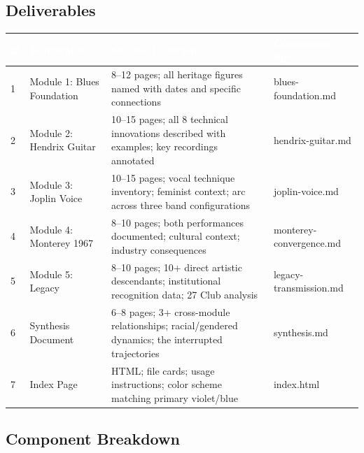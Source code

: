 \documentclass[11pt,letterpaper]{article}
\newcommand{\tableheader}[1]{\textbf{\sffamily\textcolor{white}{#1}}}
\begin{document}
\subsection{Deliverables}

\begin{center}
\begin{tabularx}{\textwidth}{C{0.5cm}L{3.5cm}L{3cm}X}
\toprule
{}
\tableheader{\#} & \tableheader{Deliverable} & \tableheader{Success Criterion} & \tableheader{Component Spec} \\
 & Module 1: Blues Foundation & 8--12 pages; all heritage figures named with dates and specific connections & blues-foundation.md \\
2 & Module 2: Hendrix Guitar & 10--15 pages; all 8 technical innovations described with examples; key recordings annotated & hendrix-guitar.md \\
3 & Module 3: Joplin Voice & 10--15 pages; vocal technique inventory; feminist context; arc across three band configurations & joplin-voice.md \\
4 & Module 4: Monterey 1967 & 8--10 pages; both performances documented; cultural context; industry consequences & monterey-convergence.md \\
5 & Module 5: Legacy & 8--10 pages; 10+ direct artistic descendants; institutional recognition data; 27 Club analysis & legacy-transmission.md \\
6 & Synthesis Document & 6--8 pages; 3+ cross-module relationships; racial/gendered dynamics; the interrupted trajectories & synthesis.md \\
7 & Index Page & HTML; file cards; usage instructions; color scheme matching primary violet/blue & index.html \\
\bottomrule
\end{tabularx}
\end{center}

\subsection{Component Breakdown}
\end{document}

